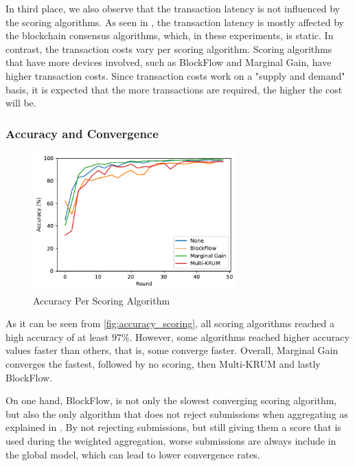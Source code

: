 In third place, we also observe that the transaction latency is not influenced by the scoring algorithms. As seen in , the transaction latency is mostly affected by the blockchain consensus algorithms, which, in these experiments, is static. In contrast, the transaction costs vary per scoring algorithm. Scoring algorithms that have more devices involved, such as BlockFlow and Marginal Gain, have higher transaction costs. Since transaction costs work on a "supply and demand" basis, it is expected that the more transactions are required, the higher the cost will be.

\subsubsection{Accuracy and Convergence}

\begin{figure}[!ht]
    \centering
    \centering
    \includegraphics[width=0.7\textwidth]{graphics/scoring/accuracy.pdf}
    \caption{Accuracy Per Scoring Algorithm}
    \label{fig:accuracy_scoring}
\end{figure}

As it can be seen from \autoref{fig:accuracy_scoring}, all scoring algorithms reached a high accuracy of at least  $97\%$. However, some algorithms reached higher accuracy values faster than others, that is, some converge faster. Overall, Marginal Gain converges the fastest, followed by no scoring, then Multi-KRUM and lastly BlockFlow.

On one hand, BlockFlow, is not only the slowest converging scoring algorithm, but also the only algorithm that does not reject submissions when aggregating as explained in . By not rejecting submissions, but still giving them a score that is used during the weighted aggregation, worse submissions are always include in the global model, which can lead to lower convergence rates. 

